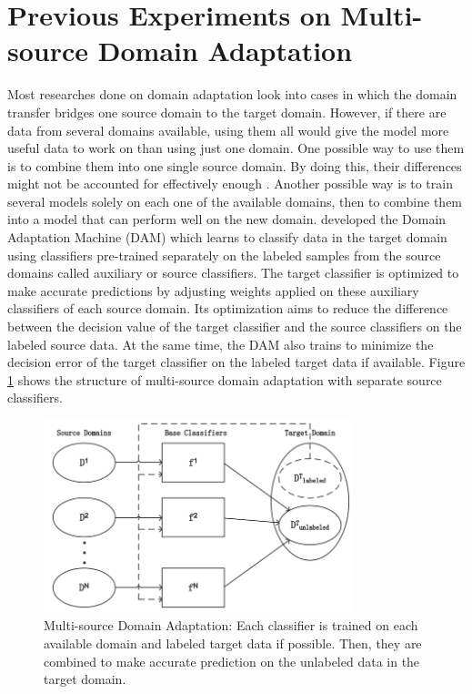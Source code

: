 \section*{Previous Experiments on Multi-source Domain Adaptation}
Most researches done on domain adaptation look into cases in which the domain transfer bridges one source domain to the target domain. However, if there are data from several domains available, using them all would give the model more useful data to work on than using just one domain. One possible way to use them is to combine them into one single source domain. By doing this, their differences might not be accounted for effectively enough \cite{multisourceDAsurvey}. Another possible way is to train several models solely on each one of the available domains, then to combine them into a model that can perform well on the new domain. \cite{multiDAclassi} developed the Domain Adaptation Machine (DAM) which learns to classify data in the target domain using classifiers pre-trained separately on the labeled samples from the source domains called auxiliary or source classifiers. The target classifier is optimized to make accurate predictions by adjusting weights applied on these auxiliary classifiers of each source domain. Its optimization aims to reduce the difference between the decision value of the target classifier and the source classifiers on the labeled source data. At the same time, the DAM also trains to minimize the decision error of the target classifier on the labeled target data if available. Figure \ref{fig:auxclassifiers} shows the structure of multi-source domain adaptation with separate source classifiers.

\begin{figure}[tbh]
  \centering
    \includegraphics[width=0.8\textwidth]{abbildungen/multiDAclassi.png}
  \caption{Multi-source Domain Adaptation: Each classifier is trained on each available domain and labeled target data if possible. Then, they are combined to make accurate prediction on the unlabeled data in the target domain. \cite{multisourceDAsurvey}}
  \label{fig:auxclassifiers}
\end{figure}

